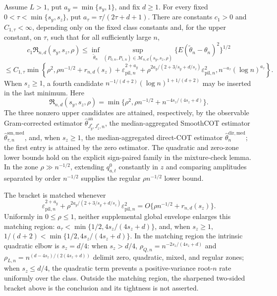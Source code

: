 Assume \(L>1\), put \(a_y=\min\{s_y,1\}\), and fix \(d\ge1\). For every fixed \(0<\tau<\min\{s_y,s_z\}\), put \(a_\tau=\tau/(2\tau+d+1)\). There are constants \(c_1>0\) and \(C_{1,\tau}<\infty\), depending only on the fixed class constants and, for the upper constant, on \(\tau\), such that for all sufficiently large \(n\),
\[
c_1\mathfrak R_{n,d}(s_y,s_z,\rho)\le\inf_{\widetilde\theta_n}\sup_{(P_{0,n},P_{1,n})\in\mathcal M_{n,d}(s_y,s_z,\rho)}\{E(\widetilde\theta_n-\theta_n)^2\}^{1/2}
\]
\[
\le C_{1,\tau}\min\!\left\{
\rho^2,
\rho n^{-1/2}+r_{n,d}(s_z)+\varepsilon_{\mathrm{pil},n}^{2+a_y}+\rho^{2a_y/(2+3/s_y+d/s_z)}\varepsilon_{\mathrm{pil},n}^2,
n^{-a_\tau}(\log n)^{a_\tau}
\right\}.
\]
When \(s_z\ge1\), a fourth candidate \(n^{-1/(d+2)}(\log n)^{1+1/(d+2)}\) may be inserted in the last minimum. Here
\[
\mathfrak R_{n,d}(s_y,s_z,\rho)=\min\{\rho^2,\rho n^{-1/2}+n^{-4s_z/(4s_z+d)}\}.
\]
The three nonzero upper candidates are attained, respectively, by the observable Gram-corrected estimator \(\widehat\theta^{\mathrm{an}}_{J_y^*,J_z^*,n}\), the median-aggregated SmoothCOT estimator \(\widehat\theta^{\mathrm{sm,med}}_{\tau,n}\), and, when \(s_z\ge1\), the median-aggregated direct-COT estimator \(\widehat\theta_n^{\mathrm{dir,med}}\); the first entry is attained by the zero estimator. The quadratic and zero-zone lower bounds hold on the explicit sign-paired family in the mixture-check lemma. In the zone \(\rho\gg n^{-1/2}\), extending \(q_{a,t}^{0}\) constantly in \(z\) and comparing amplitudes separated by order \(n^{-1/2}\) supplies the regular \(\rho n^{-1/2}\) lower bound.

The bracket is matched whenever
\[
\varepsilon_{\mathrm{pil},n}^{2+a_y}+\rho^{2a_y/(2+3/s_y+d/s_z)}\varepsilon_{\mathrm{pil},n}^2
=O\{\rho n^{-1/2}+r_{n,d}(s_z)\}.
\]
Uniformly in \(0\le\rho\le1\), neither supplemental global envelope enlarges this matching region: \(a_\tau<\min\{1/2,4s_z/(4s_z+d)\}\), and, when \(s_z\ge1\), \(1/(d+2)<\min\{1/2,4s_z/(4s_z+d)\}\). In the matching region the intrinsic quadratic elbow is \(s_z=d/4\): when \(s_z>d/4\), \(\rho_{Q,n}=n^{-2s_z/(4s_z+d)}\) and \(\rho_{L,n}=n^{(d-4s_z)/(2(4s_z+d))}\) delimit zero, quadratic, mixed, and regular zones; when \(s_z\le d/4\), the quadratic term prevents a positive-variance root-\(n\) rate uniformly over the class. Outside the matching region, the sharpened two-sided bracket above is the conclusion and its tightness is not asserted.